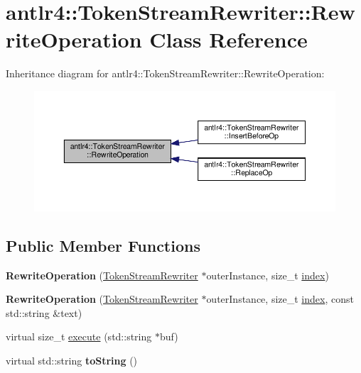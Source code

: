 \hypertarget{classantlr4_1_1TokenStreamRewriter_1_1RewriteOperation}{}\section{antlr4\+:\+:Token\+Stream\+Rewriter\+:\+:Rewrite\+Operation Class Reference}
\label{classantlr4_1_1TokenStreamRewriter_1_1RewriteOperation}


Inheritance diagram for antlr4\+:\+:Token\+Stream\+Rewriter\+:\+:Rewrite\+Operation\+:
\nopagebreak
\begin{figure}[H]
\begin{center}
\leavevmode
\includegraphics[width=350pt]{classantlr4_1_1TokenStreamRewriter_1_1RewriteOperation__inherit__graph}
\end{center}
\end{figure}
\subsection*{Public Member Functions}
\begin{DoxyCompactItemize}
\item 
\mbox{\label{classantlr4_1_1TokenStreamRewriter_1_1RewriteOperation_a2e15f057567b203697625ba54176c70f}} 
{\bfseries Rewrite\+Operation} (\hyperlink{classantlr4_1_1TokenStreamRewriter}{Token\+Stream\+Rewriter} $\ast$outer\+Instance, size\+\_\+t \hyperlink{classantlr4_1_1TokenStreamRewriter_1_1RewriteOperation_a1d3d3c3b22f030f300b3fd7c41a5ec47}{index})
\item 
\mbox{\label{classantlr4_1_1TokenStreamRewriter_1_1RewriteOperation_ae481d06f75d98d8c279f676872778e6e}} 
{\bfseries Rewrite\+Operation} (\hyperlink{classantlr4_1_1TokenStreamRewriter}{Token\+Stream\+Rewriter} $\ast$outer\+Instance, size\+\_\+t \hyperlink{classantlr4_1_1TokenStreamRewriter_1_1RewriteOperation_a1d3d3c3b22f030f300b3fd7c41a5ec47}{index}, const std\+::string \&text)
\item 
virtual size\+\_\+t \hyperlink{classantlr4_1_1TokenStreamRewriter_1_1RewriteOperation_a9e9998fb2aa14bbf60710dde1d6d50b0}{execute} (std\+::string $\ast$buf)
\item 
\mbox{\label{classantlr4_1_1TokenStreamRewriter_1_1RewriteOperation_a24d28ca0f57562670f4e1196d19527c0}} 
virtual std\+::string {\bfseries to\+String} ()
\end{DoxyCompactItemize}
